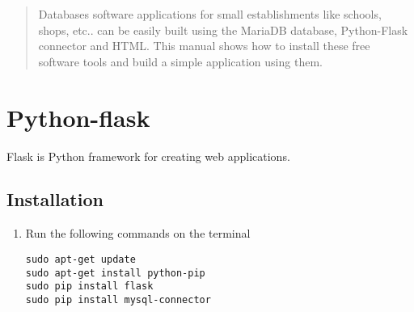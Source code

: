 \documentclass[journal,12pt,twocolumn]{IEEEtran}
\begin{document}
\maketitle

\tableofcontents

\bigskip

\begin{abstract}
Databases software applications for small establishments like schools, shops, etc.. can be easily built using the MariaDB database, Python-Flask connector and HTML.  This manual shows how to install these  free software tools and build a simple application using them.
\end{abstract}




%
\IEEEpeerreviewmaketitle


%
%

\section{Python-flask}

 Flask is Python framework for creating web applications.
\subsection{Installation}
\begin{enumerate}
\item Run the following commands on the terminal
\begin{lstlisting}
sudo apt-get update
sudo apt-get install python-pip
sudo pip install flask
sudo pip install mysql-connector
\end{lstlisting}
\end{enumerate}
\end{document}
